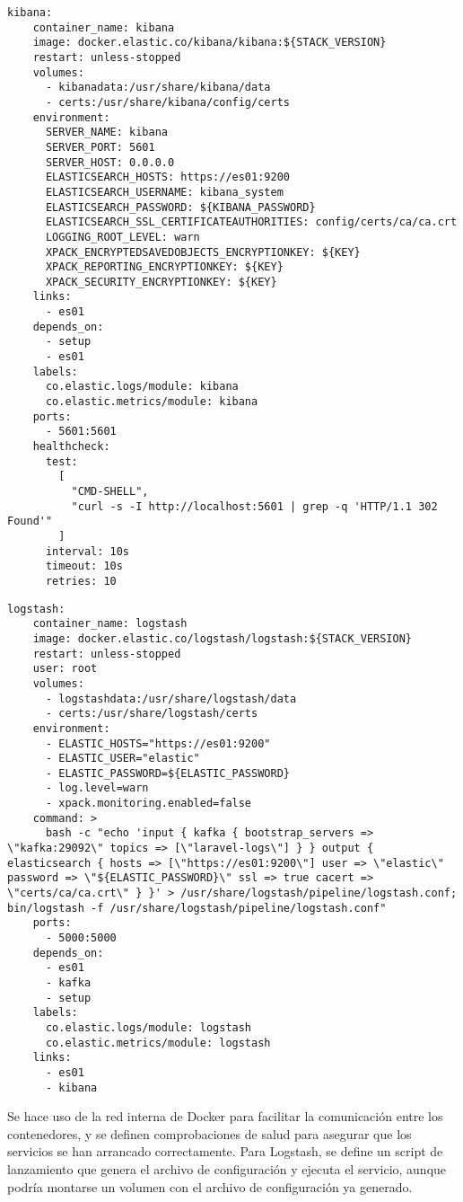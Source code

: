 \begin{lstlisting}[style=yaml, caption={Definición de los servicios de Kibana}]
kibana:
    container_name: kibana
    image: docker.elastic.co/kibana/kibana:${STACK_VERSION}
    restart: unless-stopped
    volumes:
      - kibanadata:/usr/share/kibana/data
      - certs:/usr/share/kibana/config/certs
    environment:
      SERVER_NAME: kibana
      SERVER_PORT: 5601
      SERVER_HOST: 0.0.0.0
      ELASTICSEARCH_HOSTS: https://es01:9200
      ELASTICSEARCH_USERNAME: kibana_system
      ELASTICSEARCH_PASSWORD: ${KIBANA_PASSWORD}
      ELASTICSEARCH_SSL_CERTIFICATEAUTHORITIES: config/certs/ca/ca.crt
      LOGGING_ROOT_LEVEL: warn
      XPACK_ENCRYPTEDSAVEDOBJECTS_ENCRYPTIONKEY: ${KEY}
      XPACK_REPORTING_ENCRYPTIONKEY: ${KEY}
      XPACK_SECURITY_ENCRYPTIONKEY: ${KEY}
    links:
      - es01
    depends_on:
      - setup
      - es01
    labels:
      co.elastic.logs/module: kibana
      co.elastic.metrics/module: kibana
    ports:
      - 5601:5601
    healthcheck:
      test:
        [
          "CMD-SHELL",
          "curl -s -I http://localhost:5601 | grep -q 'HTTP/1.1 302 Found'"
        ]
      interval: 10s
      timeout: 10s
      retries: 10
\end{lstlisting}

\begin{lstlisting}[style=yaml, caption={Definición de los servicios de Logstash}]
logstash:
    container_name: logstash
    image: docker.elastic.co/logstash/logstash:${STACK_VERSION}
    restart: unless-stopped
    user: root
    volumes:
      - logstashdata:/usr/share/logstash/data
      - certs:/usr/share/logstash/certs
    environment:
      - ELASTIC_HOSTS="https://es01:9200"
      - ELASTIC_USER="elastic"
      - ELASTIC_PASSWORD=${ELASTIC_PASSWORD}
      - log.level=warn
      - xpack.monitoring.enabled=false
    command: >
      bash -c "echo 'input { kafka { bootstrap_servers => \"kafka:29092\" topics => [\"laravel-logs\"] } } output { elasticsearch { hosts => [\"https://es01:9200\"] user => \"elastic\" password => \"${ELASTIC_PASSWORD}\" ssl => true cacert => \"certs/ca/ca.crt\" } }' > /usr/share/logstash/pipeline/logstash.conf; bin/logstash -f /usr/share/logstash/pipeline/logstash.conf"
    ports:
      - 5000:5000
    depends_on:
      - es01
      - kafka
      - setup
    labels:
      co.elastic.logs/module: logstash
      co.elastic.metrics/module: logstash
    links:
      - es01
      - kibana
\end{lstlisting}

Se hace uso de la red interna de Docker para facilitar la comunicación entre los
contenedores, y se definen comprobaciones de salud para asegurar que los
servicios se han arrancado correctamente. Para Logstash, se define un script de
lanzamiento que genera el archivo de configuración y ejecuta el servicio, aunque
podría montarse un volumen con el archivo de configuración ya generado.

